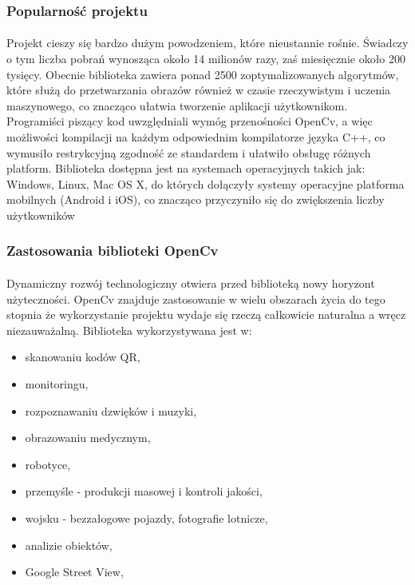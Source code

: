 \documentclass[a4paper,12pt]{article}
\begin{document}
		\subsubsection{Popularność projektu}  
			\paragraph{\indent}
				Projekt cieszy się bardzo dużym powodzeniem, które nieustannie rośnie. Świadczy o tym liczba pobrań 
				wynosząca około 14 milionów razy, zaś miesięcznie około 200 tysięcy.
				Obecnie biblioteka zawiera ponad 2500 zoptymalizowanych algorytmów, które służą do przetwarzania obrazów
				również w czasie rzeczywistym i uczenia maszynowego, co znacząco ułatwia tworzenie aplikacji użytkownikom. 
				Programiści piszący kod uwzględniali wymóg przenośności OpenCv, a więc możliwości kompilacji na każdym odpowiednim kompilatorze języka C++, co wymusiło restrykcyjną zgodność ze standardem i ułatwiło obsługę różnych platform.
				Biblioteka dostępna jest na systemach operacyjnych takich jak: Windows, Linux, Mac OS X, do których dołączyły systemy operacyjne platforma mobilnych (Android i iOS), co znacząco przyczyniło się do zwiększenia liczby użytkowników

		\subsubsection{Zastosowania biblioteki OpenCv}
			\paragraph{\indent} 
			    Dynamiczny rozwój technologiczny otwiera przed biblioteką nowy horyzont użyteczności. OpenCv znajduje zastosowanie w wielu obszarach życia do tego stopnia że wykorzystanie projektu wydaje się rzeczą całkowicie naturalna a wręcz niezauważalną. Biblioteka wykorzystywana jest w:
			
			    \begin{spacing}{1}
			        \begin{itemize}
        				\item skanowaniu kodów QR,
        				\item monitoringu,
        				\item rozpoznawaniu dzwięków i muzyki,
        				\item obrazowaniu medycznym,
        				\item robotyce,	
        				\item przemyśle - produkcji masowej i kontroli jakości,
        				\item wojsku - bezzałogowe pojazdy, fotografie lotnicze,
				        \item analizie obiektów,
				        \item Google Street View,
		            \end{itemize}
                \end{spacing}
    
\end{document}
